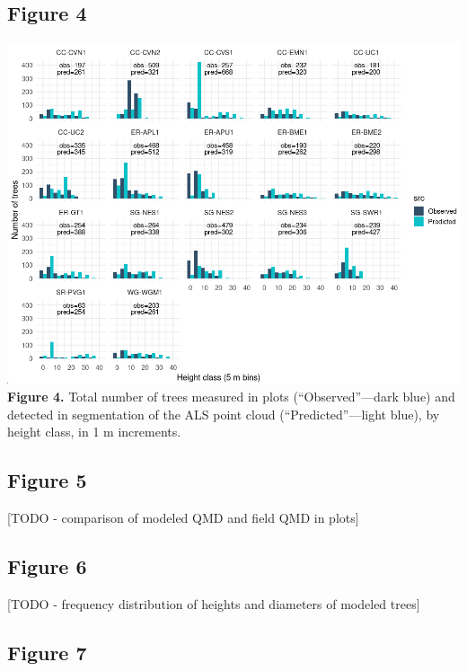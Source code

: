 \documentclass[
  12pt,
]{article}
\begin{document}
\clearpage

\newpage

\subsection{Figure 4}\label{figure-4}

\includegraphics{./Figures/Fig4.png} \textbf{Figure 4.} Total number of
trees measured in plots (``Observed''---dark blue) and detected in
segmentation of the ALS point cloud (``Predicted''---light blue), by
height class, in 1 m increments. \clearpage

\newpage

\subsection{Figure 5}\label{figure-5}

{[}TODO - comparison of modeled QMD and field QMD in plots{]}

\subsection{Figure 6}\label{figure-6}

{[}TODO - frequency distribution of heights and diameters of modeled
trees{]}

\subsection{Figure 7}\label{figure-7}
\end{document}
